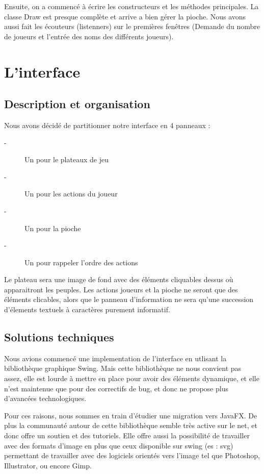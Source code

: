 \documentclass[11pt]{report}
\begin{document}
	Ensuite, on a commencé à écrire les constructeurs et les méthodes principales. La classe Draw est presque complète et arrive a bien gérer la pioche. Nous avons aussi fait les écouteurs (listenners) sur le premières fenêtres (Demande du nombre de joueurs et l'entrée des noms des différents joueurs). 

\chapter{L'interface}

	\section{Description et organisation}
		Nous avons décidé de partitionner notre interface en 4 panneaux :
		\begin{description}
			\item[-]Un pour le plateaux de jeu
			\item[-]Un pour les actions du joueur
			\item[-]Un pour la pioche
			\item[-]Un pour rappeler l'ordre des actions
		\end{description}	
		
				Le plateau sera une image de fond avec des éléments cliquables dessus où apparaitront les peuples. Les actions joueurs et la pioche ne seront que des éléments clicables, alors	que le panneau d'information ne sera qu'une succession d'élements textuels à caractères purement informatif. 
	\section{Solutions techniques}
		Nous avions commencé une implementation de l'interface en utlisant la bibliothèque graphique Swing. Mais cette bibliothèque ne nous convient pas assez, elle est lourde à mettre en place pour avoir des éléments dynamique, et elle n'est maintenue que pour des correctifs de bug, et donc ne propose plus d'avancées technologiques. 
		
		Pour ces raisons, nous sommes en train d'étudier une migration vers JavaFX. De plus la communauté autour de cette bibliothèque semble très active sur le net, et donc offre un soutien et des tutoriels. Elle offre aussi la possibilité de travailler avec des formats d'image en plus que ceux disponible sur swing (es : svg) permettant de travailler avec des logiciels orientés vers l'image tel que Photoshop\up{\copyright}, Illustrator\up{\copyright}, ou encore Gimp\up{\copyright}. 
		
\end{document}
